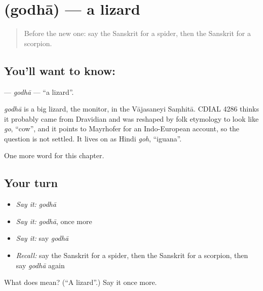 \section[\texorpdfstring{\sk{गोधा} (godhā)}{गोधा (godhā)}]{ (godhā) — a lizard}

\label{lesson:SA-C253-godha}



\begin{quote}
Before the new one: say the Sanskrit for a spider, then the Sanskrit for a scorpion.
\end{quote}

\subsection*{You'll want to know: }
\textbf{} — \emph{godhā} — \textquotedblleft{}a lizard\textquotedblright{}.

\begin{cousinweb}
\emph{godhā} is a big lizard, the monitor, in the Vājasaneyi Saṃhitā. CDIAL 4286 thinks it probably came from Dravidian and was reshaped by folk etymology to look like \emph{go}, \textquotedblleft{}cow\textquotedblright{}, and it points to Mayrhofer for an Indo-European account, so the question is not settled. It lives on as Hindi \emph{goh}, \textquotedblleft{}iguana\textquotedblright{}.
\end{cousinweb}

\begin{grammarlens}[title={What you've built}]
One more word for this chapter.
\end{grammarlens}

\subsection*{Your turn}
\begin{itemize}
\raggedright
  \item \emph{Say it:} \emph{godhā}
  \item \emph{Say it:} \emph{godhā}, once more
  \item \emph{Say it:} say \emph{godhā}
  \item \emph{Recall:} say the Sanskrit for a spider, then the Sanskrit for a scorpion, then say \emph{godhā} again
\end{itemize}

\begin{tcolorbox}[breakable,colback=teal!4,colframe=teal!35!black,title={Before you move on}]
What does  mean? (\textquotedblleft{}A lizard\textquotedblright{}.) Say it once more.
\end{tcolorbox}
